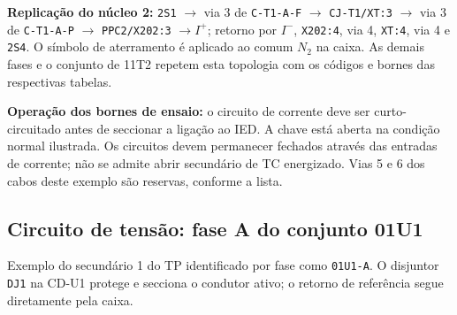 \documentclass[11pt,a4paper]{article}
\begin{document}
\textbf{Replicação do núcleo 2:}
\texttt{2S1} $\rightarrow$ via 3 de \texttt{C-T1-A-F}
$\rightarrow$ \texttt{CJ-T1/XT:3} $\rightarrow$ via 3 de
\texttt{C-T1-A-P} $\rightarrow$ \texttt{PPC2/X202:3} $\rightarrow I^{+}$;
retorno por $I^{-}$, \texttt{X202:4}, via 4, \texttt{XT:4}, via 4 e
\texttt{2S4}. O símbolo de aterramento é aplicado ao comum $N_2$ na caixa.
As demais fases e o conjunto de 11T2 repetem esta topologia com os códigos
e bornes das respectivas tabelas.

\textbf{Operação dos bornes de ensaio:} o circuito de corrente deve ser
curto-circuitado antes de seccionar a ligação ao IED. A chave está aberta
na condição normal ilustrada. Os circuitos devem permanecer fechados
através das entradas de corrente; não se admite abrir secundário de TC
energizado. Vias 5 e 6 dos cabos deste exemplo são reservas, conforme a lista.

\clearpage
\subsection{Circuito de tensão: fase A do conjunto 01U1}

Exemplo do secundário 1 do TP identificado por fase como
\texttt{01U1-A}. O disjuntor \texttt{DJ1} na CD-U1 protege e secciona
o condutor ativo; o retorno de referência segue diretamente pela caixa.
\end{document}
